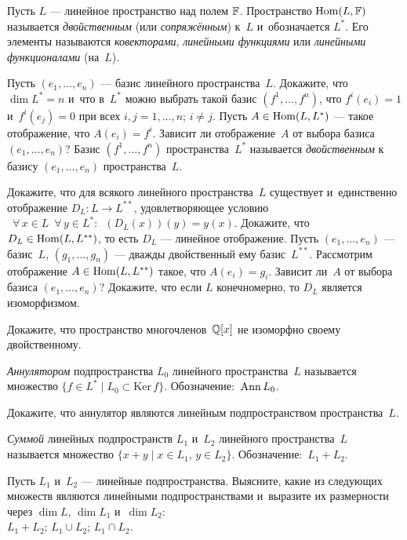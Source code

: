 \documentclass[a4paper,12pt,fleqn]{article}
\renewcommand{\ker}{\mathrm{Ker\,}}
\begin{document}

Пусть $L$ --- линейное пространство над полем $\mathbb{F}$. Пространство $\operatorname{Hom} (L,\mathbb{F})$ называется \emph{двойственным} (или \emph{сопряжённым}) к~$L$ и~обозначается $L^*$. Его элементы называются \emph{ковекторами}, \emph{линейными функциями} или \emph{линейными функционалами} (на~$L$).

Пусть $(e_1,\ldots,e_n)$ --- базис линейного пространства~$L$.
Докажите, что $\dim L^*=n$ и~что в~$L^*$ можно выбрать такой базис $(f^1,\ldots,f^n)$, что $f^i(e_i)=1$ и~$f^i(e_j)=0$ при всех $i,j=1,\ldots,n$; $i\ne j$.
Пусть $A\in\operatorname{Hom}(L,L^*)$ --- такое отображение, что $A(e_i)=f^i$. Зависит ли отображение~$A$ от выбора базиса $(e_1,\ldots,e_n)$?
Базис $(f^1,\ldots,f^n)$ пространства~$L^*$ называется \emph{двойственным} к базису $(e_1,\ldots,e_n)$ пространства~$L$.

Докажите, что для всякого линейного пространства~$L$ существует и~единственно отображение $D_L\colon L\to L^{**}$, удовлетворяющее условию
$\,\,\,\forall\,x\in L\,\,\,\forall\,y\in L^*:\,\,\,(D_L(x))(y)=y(x).$
Докажите, что $D_L\in\operatorname{Hom}(L,L^{**})$, то есть $D_L$ --- линейное отображение.
Пусть $(e_1,\ldots,e_n)$ --- базис~$L$, $(g_1,\ldots,g_n)$ --- дважды двойственный ему базис~$L^{**}$. Рассмотрим отображение $A\in\operatorname{Hom}(L,L^{**})$ такое, что $A(e_i)=g_i$. Зависит ли~$A$ от выбора базиса $(e_1,\ldots,e_n)$?
Докажите, что если $L$ конечномерно, то $D_L$ является изоморфизмом.

Докажите, что пространство многочленов~$\mathbb{Q}[x]$ не изоморфно своему двойственному.

\emph{Аннулятором} подпространства $L_0$ линейного пространства~$L$ называется множество $\{f\in L^*\mid L_0\subset\ker f\}$. Обозначение:~$\operatorname{Ann} L_0$.

Докажите, что аннулятор являются линейным подпространством пространства~$L$.

\emph{Суммой} линейных подпространств $L_1$ и~$L_2$ линейного пространства~$L$ называется множество $\{x+y\mid x\in L_1,\,y\in L_2\}$. Обозначение:~$L_1+L_2$.

Пусть $L_1$ и~$L_2$ --- линейные подпространства. Выясните, какие из следующих множеств являются линейными подпространствами и~выразите их размерности через $\dim L$, $\dim L_1$ и~$\dim L_2$:\\
 $L_1+L_2$;
 $L_1\cup L_2$;
 $L_1\cap L_2$.
\end{document}
